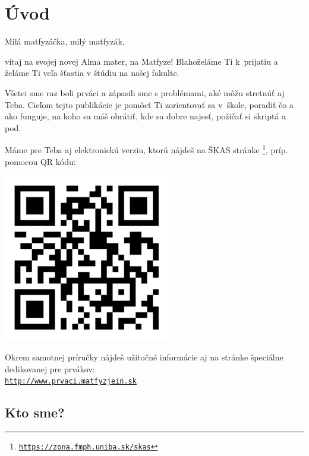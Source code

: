 \chapter{Úvod}

Milá matfyzáčka, milý matfyzák,

vitaj na svojej novej Alma mater, na Matfyze! Blahoželáme Ti k~prijatiu
a želáme Ti veľa šťastia v štúdiu na našej fakulte.

Všetci sme raz boli prváci a zápasili sme s problémami, aké môžu stretnúť
aj Teba. Cieľom tejto publikácie je pomôcť Ti zorientovať sa v~škole,
poradiť čo a ako funguje, na koho sa máš obrátiť, kde sa dobre najesť,
požičať si skriptá a pod.

Máme pre Teba aj elektronickú verziu, ktorú nájdeš na ŠKAS stránke%
\footnote{\href{https://zona.fmph.uniba.sk/skas}{\texttt{https://zona.fmph.uniba.sk/skas}}%
}, príp. pomocou QR kódu:

\begin{center}
\includegraphics[width=0.55\textwidth]{obrazky/qr_code.png}
\par\end{center}

Okrem samotnej príručky nájdeš užitočné informácie aj na stránke špeciálne dedikovanej pre prvákov: \\ \href{http://www.prvaci.matfyzjein.sk}{\texttt{http://www.prvaci.matfyzjein.sk}}

\newpage
\section*{Kto sme?}

